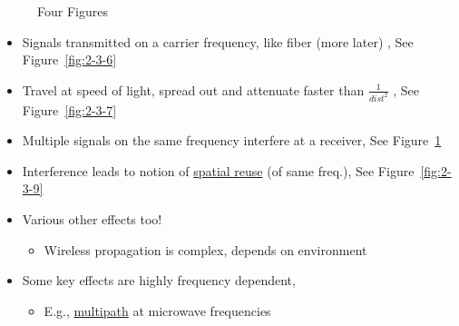 \documentclass[12pt]{ctexart}   %
\begin{document}
\begin{figure}
{\begin{minipage}[b]{0.4\textwidth}
			\end{minipage}
			\label{fig:2-3-8}
		}
		\caption{Four Figures}
	\end{figure}
	
	 \begin{itemize}
	 	\item Signals transmitted on a carrier frequency, like fiber (more later) , See Figure~\ref{fig:2-3-6}
	 	\item Travel at speed of light, spread out and attenuate faster than $\frac{1}{dist ^ 2}$ , See Figure~\ref{fig:2-3-7}
	 	\item Multiple signals on the same frequency interfere at a receiver, See Figure~\ref{fig:2-3-8}
	 	\item Interference leads to notion of \underline{spatial reuse} (of same freq.), See Figure~\ref{fig:2-3-9}
	 	
	 	\item Various other effects too!
	 	\begin{itemize}
	 		\item Wireless propagation is complex, depends on environment
	 	\end{itemize}
	 	
	 	\item Some key effects are highly frequency dependent,
	 	\begin{itemize}
	 		\item E.g., \underline{multipath} at microwave frequencies
	 	\end{itemize}
	 	
	 \end{itemize}
	 
\end{document}
